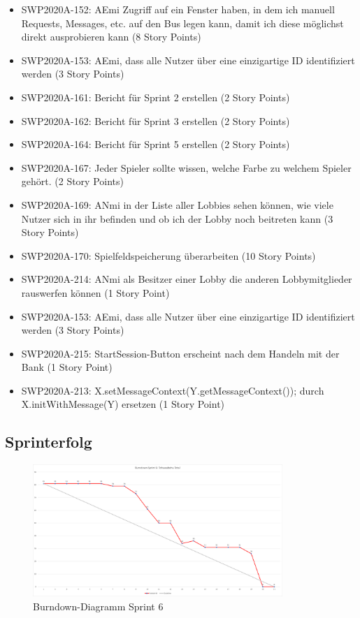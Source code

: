 \documentclass[12pt,a4paper, oneside]{article}
\begin{document}
\begin{itemize}
\item SWP2020A-152: AEmi Zugriff auf ein Fenster haben, in dem ich manuell Requests, Messages, etc. auf den Bus legen kann, damit ich diese möglichst direkt ausprobieren kann (8 Story Points)

\item SWP2020A-153: AEmi, dass alle Nutzer über eine einzigartige ID identifiziert werden (3 Story Points)

\item SWP2020A-161: Bericht für Sprint 2 erstellen (2 Story Points)

\item SWP2020A-162: Bericht für Sprint 3 erstellen (2 Story Points)

\item SWP2020A-164: Bericht für Sprint 5 erstellen (2 Story Points)

\item SWP2020A-167: Jeder Spieler sollte wissen, welche Farbe zu welchem Spieler gehört. (2 Story Points)

\item SWP2020A-169: ANmi in der Liste aller Lobbies sehen können, wie viele Nutzer sich in ihr befinden und ob ich der Lobby noch beitreten kann (3 Story Points)

\item SWP2020A-170: Spielfeldspeicherung überarbeiten (10 Story Points)

\item SWP2020A-214: ANmi als Besitzer einer Lobby die anderen Lobbymitglieder rauswerfen können (1 Story Point)

\item SWP2020A-153: AEmi, dass alle Nutzer über eine einzigartige ID identifiziert werden (3 Story Points)

\item SWP2020A-215: StartSession-Button erscheint nach dem Handeln mit der Bank (1 Story Point)

\item SWP2020A-213: X.setMessageContext(Y.getMessageContext()); durch X.initWithMessage(Y) ersetzen (1 Story Point)

\end{itemize}

\newpage
\subsection{Sprinterfolg}
\begin{figure}[h]
    \centering
    \includegraphics[width=\textwidth, height=5cm]{../img/sprint_06/Burndown-Sprint6.png}
    \caption{Burndown-Diagramm Sprint 6}
    \label{fig: Burndown-Sprint6}
\end{figure}
\end{document}
